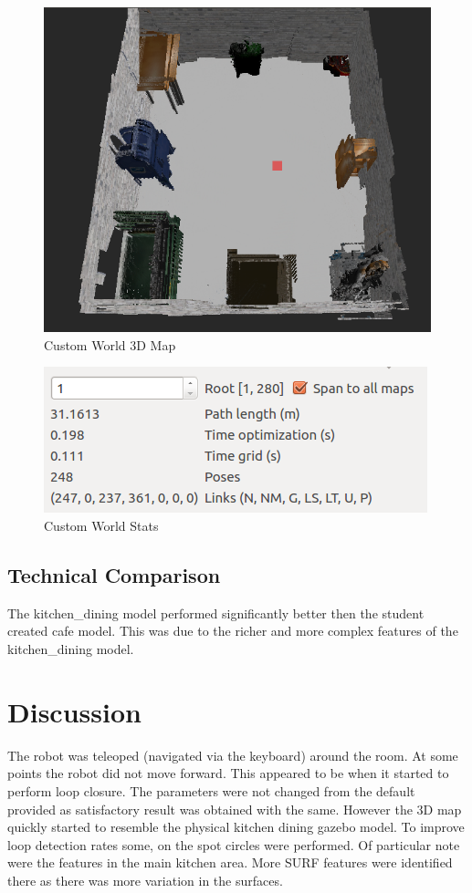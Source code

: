 \documentclass[10pt,journal,compsoc]{IEEEtran}
\begin{document}
\begin{figure}[thpb]
      \centering
      \includegraphics[width=\linewidth]{images/9_3d_view}
      \caption{Custom World 3D Map}
      \label{fig:custom3d}
\end{figure}

\begin{figure}[thpb]
      \centering
      \includegraphics[width=\linewidth]{images/8_graph_stats}
      \caption{Custom World Stats}
      \label{fig:customstats}
\end{figure}
\subsection{Technical Comparison} %
The kitchen\_dining model performed significantly better then the student created cafe model. This was due to the richer and more complex features of the kitchen\_dining model.

\section{Discussion}
The robot was teleoped (navigated via the keyboard) around the room. At some points the robot did not move forward. This appeared to be when it started to perform loop closure. 
The parameters were not changed from the default provided as satisfactory result was obtained with the same.
However the 3D map quickly started to resemble the physical kitchen dining gazebo model. To improve loop detection rates some, on the spot circles were performed. Of particular note were the features in the main kitchen area. More SURF features were identified there as there was more variation in the surfaces.
\end{document}
